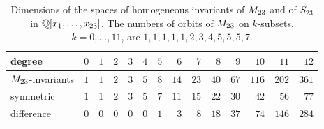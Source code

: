 \begin{table}[ht]
\centering\small
\begin{tabular}{@{}lrrrrrrrrrrrrr@{}}
\toprule
degree & $0$ & $1$ & $2$ & $3$ & $4$ & $5$ & $6$ & $7$ & $8$ & $9$ & $10$ & $11$ & $12$\\
\midrule
$M_{23}$-invariants & $1$ & $1$ & $2$ & $3$ & $5$ & $8$ & $14$ & $23$ & $40$ & $67$ & $116$ & $202$ & $361$\\
symmetric & $1$ & $1$ & $2$ & $3$ & $5$ & $7$ & $11$ & $15$ & $22$ & $30$ & $42$ & $56$ & $77$\\
difference & $0$ & $0$ & $0$ & $0$ & $0$ & $1$ & $3$ & $8$ & $18$ & $37$ & $74$ & $146$ & $284$\\
\bottomrule
\end{tabular}
\caption{Dimensions of the spaces of homogeneous invariants of $M_{23}$ and of $S_{23}$ in $\mathbb{Q}[x_1,\dots,x_{23}]$. The numbers of orbits of $M_{23}$ on $k$-subsets, $k=0,\dots,11$, are $1,1,1,1,1,2,3,4,5,5,5,7$.}
\label{tab:molien}
\end{table}

